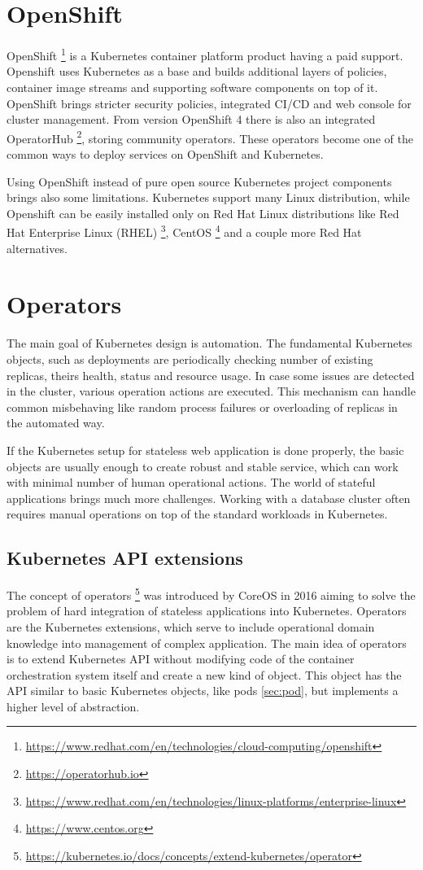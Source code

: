 \documentclass[
  digital, %
  twoside, %
  table,   %
  lof,     %
  lot,     %
]{fithesis3}
\begin{document}
\section{OpenShift} \label{sec:openshift}
OpenShift \footnote{\url{https://www.redhat.com/en/technologies/cloud-computing/openshift}} is a Kubernetes container platform product having a paid support. Openshift uses Kubernetes as a base and builds additional layers of policies, container image streams and supporting software components on top of it. OpenShift brings stricter security policies, integrated CI/CD and web console for cluster management. From version OpenShift 4 there is also an integrated OperatorHub \footnote{\url{https://operatorhub.io}}, storing community operators. These operators become one of the common ways to deploy services on OpenShift and Kubernetes.

Using OpenShift instead of pure open source Kubernetes project components brings also some limitations. Kubernetes support many Linux distribution, while Openshift can be easily installed only on Red Hat Linux distributions like Red Hat Enterprise Linux (RHEL) \footnote{\url{https://www.redhat.com/en/technologies/linux-platforms/enterprise-linux}}, CentOS \footnote{\url{https://www.centos.org}} and a couple more Red Hat alternatives.

\section{Operators} \label{sec:operators}
The main goal of Kubernetes design is automation. The fundamental Kubernetes objects, such as deployments are periodically checking number of existing replicas, theirs health, status and resource usage. In case some issues are detected in the cluster, various operation actions are executed. This mechanism can handle common misbehaving like random process failures or overloading of replicas in the automated way.

If the Kubernetes setup for stateless web application is done properly, the basic objects are usually enough to create robust and stable service, which can work with minimal number of human operational actions. The world of stateful applications brings much more challenges. Working with a database cluster often requires manual operations on top of the standard workloads in Kubernetes.

\subsection{Kubernetes API extensions}
The concept of operators \footnote{\url{https://kubernetes.io/docs/concepts/extend-kubernetes/operator}} was introduced by CoreOS \cite{operators} in 2016 aiming to solve the problem of hard integration of stateless applications into Kubernetes. Operators  are the Kubernetes extensions, which serve to include operational domain knowledge into management of complex application. The main idea of operators is to extend Kubernetes API without modifying code of the container orchestration system itself and create a new kind of object. This object has the API similar to basic Kubernetes objects, like pods \ref{sec:pod}, but implements a higher level of abstraction.
\end{document}
